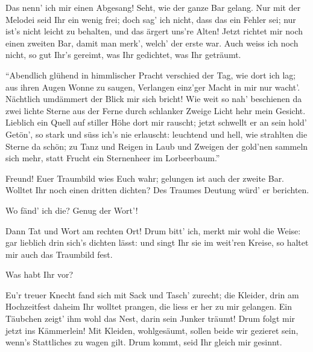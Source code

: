 \begin{drama}
\Sachsspeaks


Das nenn' ich mir einen Abgesang!
Seht, wie der ganze Bar gelang.
Nur mit der Melodei seid Ihr ein wenig frei;
doch sag' ich nicht, dass das ein Fehler sei;
nur ist's nicht leicht zu behalten,
und das ärgert uns're Alten!
Jetzt richtet mir noch einen zweiten Bar,
damit man merk', welch' der erste war.
Auch weiss ich noch nicht, so gut Ihr's gereimt,
was Ihr gedichtet, was Ihr geträumt.

\Waltherspeaks
``Abendlich glühend in himmlischer Pracht
verschied der Tag, wie dort ich lag;
aus ihren Augen Wonne zu saugen,
Verlangen einz'ger Macht in mir nur wacht'.
Nächtlich umdämmert der Blick mir sich bricht!
Wie weit so nah' beschienen da
zwei lichte Sterne aus der Ferne
durch schlanker Zweige Licht hehr mein Gesicht.
Lieblich ein Quell
auf stiller Höhe dort mir rauscht;
jetzt schwellt er an sein hold' Getön',
so stark und süss ich's nie erlauscht:
leuchtend und hell, wie strahlten die Sterne da schön;
zu Tanz und Reigen in Laub und Zweigen
der gold'nen sammeln sich mehr,
statt Frucht ein Sternenheer
im Lorbeerbaum.''

\Sachsspeaks


Freund!
Euer Traumbild wies Euch wahr;
gelungen ist auch der zweite Bar.
Wolltet Ihr noch einen dritten dichten?
Des Traumes Deutung würd' er berichten.

\Waltherspeaks


Wo fänd' ich die? Genug der Wort'!

\Sachsspeaks


Dann Tat und Wort am rechten Ort!
Drum bitt' ich, merkt mir wohl die Weise:
gar lieblich drin sich's dichten lässt:
und singt Ihr sie im weit'ren Kreise,
so haltet mir auch das Traumbild fest.

\Waltherspeaks
Was habt Ihr vor?

\Sachsspeaks
Eu'r treuer Knecht
fand sich mit Sack und Tasch' zurecht;
die Kleider, drin am Hochzeitfest
daheim Ihr wolltet prangen,
die liess er her zu mir gelangen.
Ein Täubchen zeigt' ihm wohl das Nest,
darin sein Junker träumt!
Drum folgt mir jetzt ins Kämmerlein!
Mit Kleiden, wohlgesäumt,
sollen beide wir gezieret sein,
wenn's Stattliches zu wagen gilt.
Drum kommt, seid Ihr gleich mir gesinnt.


\end{drama}
